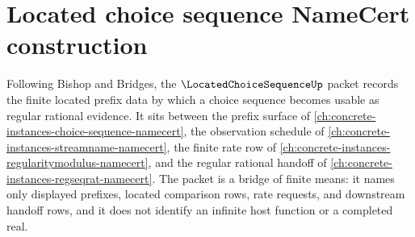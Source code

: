 \chapter{Located choice sequence NameCert construction}
\label{ch:concrete-instances-located-choice-sequence-namecert}

Following Bishop and Bridges, the $\LocatedChoiceSequenceUp$ packet records the finite located prefix data by which a choice sequence becomes usable as regular rational evidence. It sits between the prefix surface of \autoref{ch:concrete-instances-choice-sequence-namecert}, the observation schedule of \autoref{ch:concrete-instances-streamname-namecert}, the finite rate row of \autoref{ch:concrete-instances-regularitymodulus-namecert}, and the regular rational handoff of \autoref{ch:concrete-instances-regseqrat-namecert}. The packet is a bridge of finite means: it names only displayed prefixes, located comparison rows, rate requests, and downstream handoff rows, and it does not identify an infinite host function or a completed real.

